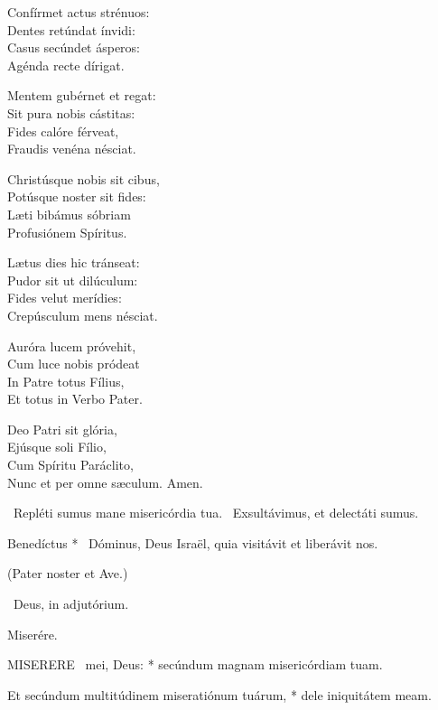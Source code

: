 Confírmet actus strénuos:\\
Dentes retúndat ínvidi:\\
Casus secúndet ásperos:\\
Agénda recte dírigat.

Mentem gubérnet et regat:\\
Sit pura nobis cástitas:\\
Fides calóre férveat,\\
Fraudis venéna nésciat.

Christúsque nobis sit cibus,\\
Potúsque noster sit fides:\\
Læti bibámus sóbriam\\
Profusiónem Spíritus.

Lætus dies hic tránseat:\\
Pudor sit ut dilúculum:\\
Fides velut merídies:\\
Crepúsculum mens nésciat.

Auróra lucem próvehit,\\
Cum luce nobis pródeat\\
In Patre totus Fílius,\\
Et totus in Verbo Pater.

Deo Patri sit glória,\\
Ejúsque soli Fílio,\\
Cum Spíritu Paráclito,\\
Nunc et per omne sæculum. Amen.

\V\ Repléti sumus mane misericórdia tua. \R\ Exsultávimus, et delectáti sumus.

 Benedíctus * \textdagger\ Dóminus, Deus Israël, quia visitávit et liberávit nos.




(Pater noster et Ave.)

\V\ Deus, in adjutórium.

 Miserére. \textdagger


\lettrine[lines=2]{M}{ISERERE} \textdagger\ mei, Deus: * secúndum magnam misericórdiam tuam.

Et secúndum multitúdinem miseratiónum tuárum, * dele iniquitátem meam.

